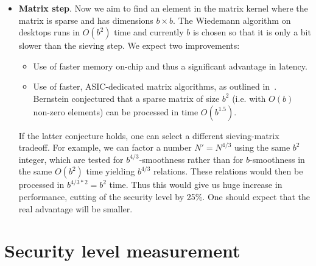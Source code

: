 \documentclass[a4paper]{article}
\begin{document}
\begin{itemize}
     \item \textbf{Matrix step}. Now we aim to find an element in the matrix kernel where the matrix is sparse and has dimensions $b\times b$. The Wiedemann algorithm on desktops runs in $O(b^2)$ time and currently  $b$ is chosen so that it is only a bit slower than the sieving step. We expect two improvements: 
     \begin{itemize}
         \item Use of faster memory on-chip and thus a significant advantage in latency. 
         \item Use of faster, ASIC-dedicated matrix algorithms, as outlined in~\cite{bernstein01}. Bernstein conjectured that a sparse matrix of size $b^2$ (i.e. with $O(b)$ non-zero elements) can be processed in time $O(b^{1.5})$.
     \end{itemize}
     If  the latter conjecture holds, one can select a different sieving-matrix tradeoff. For example, we can factor a number $N'=N^{4/3}$ using the same $b^2$ integer, which are  tested for $b^{4/3}$-smoothness rather than for $b$-smoothness in the same $O(b^2)$ time yielding $b^{4/3}$ relations. These relations would then be processed in $b^{4/3*2} = b^2$ time. Thus this would give us huge increase in performance, cutting of the security level by 25\%. One should expect that the real advantage will be smaller.
      
 \end{itemize}
 
\section{Security level measurement}\label{sec:measure}
\end{document}
